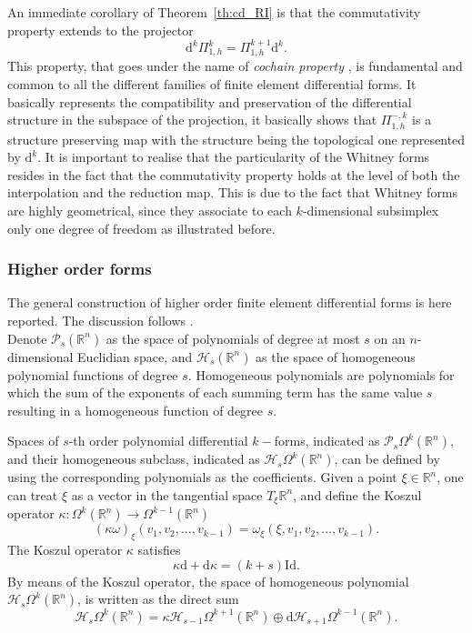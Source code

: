 \documentclass{elsarticle}
\renewcommand\d{\ensuremath{\mathrm{d}}}
\newcommand{\bbR}{\mathbb{R}}
\begin{document}
An immediate corollary of Theorem~\ref{th:cd_RI} is that the commutativity property extends to the projector 
\begin{equation*}
\d^k \Pi_{1, h}^k = \Pi_{1, h}^{k+1}\d^k.    
\end{equation*}
This property, that goes under the name of {\it cochain property} \cite{arnold2018finite}, is fundamental and common to all the different families of finite element differential forms. It basically represents the compatibility and preservation of the differential structure in the subspace of the projection, it basically shows that $\Pi_{1, h}^{-, k}$ is a structure preserving map with the structure being the topological one represented by $\d^k$. It is important to realise that the particularity of the Whitney forms resides in the fact that the commutativity property holds at the level of both the interpolation and the reduction map. This is due to the fact that Whitney forms are highly geometrical, since they associate to each $k$-dimensional subsimplex only one degree of freedom as illustrated before.

\subsubsection{Higher order forms}
The general construction of higher order finite element differential forms is here reported. The discussion follows \cite{wu2021hodgewave}. \\


Denote $\mathcal{P}_s(\bbR^n)$ as the space of polynomials of degree at most $s$ on an $n$-dimensional Euclidian space, and $\mathcal{H}_s(\bbR^n)$ as the space of homogeneous polynomial functions of degree $s$. Homogeneous polynomials are polynomials for which the sum of the exponents of each summing term has the same value $s$ resulting in a homogeneous function of degree $s$.

Spaces of $s$-th order polynomial differential $k-$forms, indicated as $\mathcal{P}_s\Omega^k(\bbR^n)$, and their homogeneous subclass, indicated as $\mathcal{H}_s \Omega^k(\bbR^n)$, can be defined by using the corresponding polynomials as the coefficients. Given a point $\xi \in \bbR^n$, one can treat $\xi$ as a vector in the tangential space $T_\xi\bbR^n$, and define the Koszul operator $\kappa : \Omega^k (\bbR^n) \rightarrow \Omega^{k - 1} (\bbR^n)$ 
\begin{equation}
    (\kappa\omega)_\xi(v_1, v_2, . . . , v_{k - 1}) = \omega_\xi(\xi, v_1, v_2, \dots, v_{k - 1}).
\end{equation}
The Koszul operator $\kappa$ satisfies \cite[Thm. 3.1.]{arnold2006acta}
$$\kappa\d + \d\kappa = (k + s)\mathrm{Id}.$$
By means of the Koszul operator, the space of homogeneous polynomial $\mathcal{H}_s\Omega^k(\bbR^n)$, is written as the direct sum
\begin{equation}
    \mathcal{H}_s\Omega^k(\bbR^n) = \kappa \mathcal{H}_{s - 1}\Omega^{k+1}(\bbR^n) \oplus \d\mathcal{H}_{s+1}\Omega^{k - 1}(\bbR^n).
\end{equation}
\end{document}
